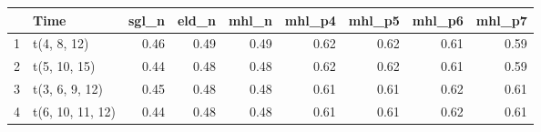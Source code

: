 \begin{table}[ht]
\centering
\begin{tabular}{rlrrrrrrr}
  \hline
 & Time & sgl\_n & eld\_n & mhl\_n & mhl\_p4 & mhl\_p5 & mhl\_p6 & mhl\_p7 \\ 
  \hline
1 & t(4, 8, 12) & 0.46 & 0.49 & 0.49 & 0.62 & 0.62 & 0.61 & 0.59 \\ 
  2 & t(5, 10, 15) & 0.44 & 0.48 & 0.48 & 0.62 & 0.62 & 0.61 & 0.59 \\ 
  3 & t(3, 6, 9, 12) & 0.45 & 0.48 & 0.48 & 0.61 & 0.61 & 0.62 & 0.61 \\ 
  4 & t(6, 10, 11, 12) & 0.44 & 0.48 & 0.48 & 0.61 & 0.61 & 0.62 & 0.61 \\ 
   \hline
\end{tabular}
\end{table}
